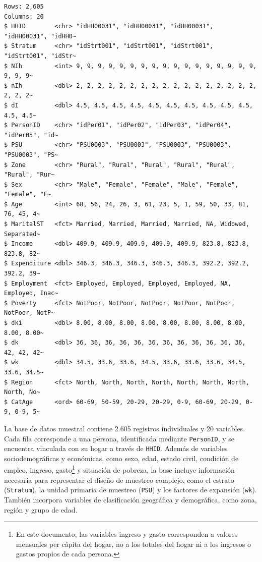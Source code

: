 \documentclass[
  spanish,
  11pt,
  letterpaper,
  oneside,
  open=any]{scrbook}
\begin{document}
\begin{verbatim}
Rows: 2,605
Columns: 20
$ HHID        <chr> "idHH00031", "idHH00031", "idHH00031", "idHH00031", "idHH0~
$ Stratum     <chr> "idStrt001", "idStrt001", "idStrt001", "idStrt001", "idStr~
$ NIh         <int> 9, 9, 9, 9, 9, 9, 9, 9, 9, 9, 9, 9, 9, 9, 9, 9, 9, 9, 9, 9~
$ nIh         <dbl> 2, 2, 2, 2, 2, 2, 2, 2, 2, 2, 2, 2, 2, 2, 2, 2, 2, 2, 2, 2~
$ dI          <dbl> 4.5, 4.5, 4.5, 4.5, 4.5, 4.5, 4.5, 4.5, 4.5, 4.5, 4.5, 4.5~
$ PersonID    <chr> "idPer01", "idPer02", "idPer03", "idPer04", "idPer05", "id~
$ PSU         <chr> "PSU0003", "PSU0003", "PSU0003", "PSU0003", "PSU0003", "PS~
$ Zone        <chr> "Rural", "Rural", "Rural", "Rural", "Rural", "Rural", "Rur~
$ Sex         <chr> "Male", "Female", "Female", "Male", "Female", "Female", "F~
$ Age         <int> 68, 56, 24, 26, 3, 61, 23, 5, 1, 59, 50, 33, 81, 76, 45, 4~
$ MaritalST   <fct> Married, Married, Married, Married, NA, Widowed, Separated~
$ Income      <dbl> 409.9, 409.9, 409.9, 409.9, 409.9, 823.8, 823.8, 823.8, 82~
$ Expenditure <dbl> 346.3, 346.3, 346.3, 346.3, 346.3, 392.2, 392.2, 392.2, 39~
$ Employment  <fct> Employed, Employed, Employed, Employed, NA, Employed, Inac~
$ Poverty     <fct> NotPoor, NotPoor, NotPoor, NotPoor, NotPoor, NotPoor, NotP~
$ dki         <dbl> 8.00, 8.00, 8.00, 8.00, 8.00, 8.00, 8.00, 8.00, 8.00, 8.00~
$ dk          <dbl> 36, 36, 36, 36, 36, 36, 36, 36, 36, 36, 36, 36, 42, 42, 42~
$ wk          <dbl> 34.5, 33.6, 33.6, 34.5, 33.6, 33.6, 33.6, 34.5, 33.6, 34.5~
$ Region      <fct> North, North, North, North, North, North, North, North, No~
$ CatAge      <ord> 60-69, 50-59, 20-29, 20-29, 0-9, 60-69, 20-29, 0-9, 0-9, 5~
\end{verbatim}

La base de datos muestral contiene 2.605 registros individuales y 20
variables. Cada fila corresponde a una persona, identificada mediante
\texttt{PersonID}, y se encuentra vinculada con su hogar a través de
\texttt{HHID}. Además de variables sociodemográficas y económicas, como
sexo, edad, estado civil, condición de empleo, ingreso, gasto\footnote{En
  este documento, las variables ingreso y gasto corresponden a valores
  mensuales per cápita del hogar, no a los totales del hogar ni a los
  ingresos o gastos propios de cada persona.} y situación de pobreza, la
base incluye información necesaria para representar el diseño de
muestreo complejo, como el estrato (\texttt{Stratum}), la unidad
primaria de muestreo (\texttt{PSU}) y los factores de expansión
(\texttt{wk}). También incorpora variables de clasificación geográfica y
demográfica, como zona, región y grupo de edad.
\end{document}
